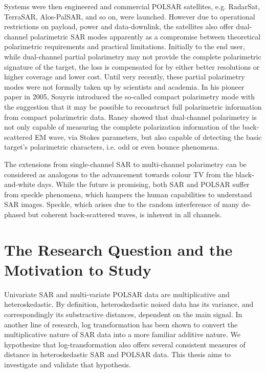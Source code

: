Systems were then engineered and commercial POLSAR satellites, e.g. RadarSat, TerraSAR, Alos-PalSAR, and so on, were launched.
However due to operational restrictions on payload, power and data-downlink, the satellites also offer dual-channel polarimetric SAR modes apparently as a compromise between theoretical polarimetric requirements and practical limitations.
Initially to the end user, while dual-channel partial polarimetry may not provide the complete polarimetric signature of the target, the loss is compensated for by either better resolutions or higher coverage and lower cost.
Until very recently, these partial polarimetry modes were not formally taken up by scientists and academia. 
In his pioneer paper in 2005, Souyris\cite{Souyris_2005_TGRS} introduced the so-called compact polarimetry mode with the suggestion that it may be possible to reconstruct full polarimetric information from compact polarimetric data.
Raney\cite{Raney_2006_IGARSS} showed that dual-channel polarimetry is not only capable of measuring the complete polarization information of the back-scattered EM wave, via Stokes parameters, but also capable of detecting the basic target's polarimetric characters, i.e. odd or even bounce phenomena.

The extensions from single-channel SAR to multi-channel polarimetry can be considered as analogous to the advancement towards colour TV from the black-and-white days.
While the future is promising, both SAR and POLSAR suffer from speckle phenomena, which hampers the human capabilities to understand SAR images.
Speckle, which arises due to the random interference of many de-phased but coherent back-scattered waves, is inherent in all channels.

\section{The Research Question and the Motivation to Study}

Univariate SAR and multi-variate POLSAR data are multiplicative and heteroskedastic.
By definition, heteroskedastic noised data has its variance, and correspondingly its substractive distances,
  dependent on the main signal.
In another line of research, log transformation has been shown
  to convert the multiplicative nature of SAR data into a more familiar additive nature.
We hypothesize that   
  log-transformation also offers several consistent measures of distance in heteroskedastic SAR and POLSAR data.
This thesis aims to investigate and validate that hypothesis.

